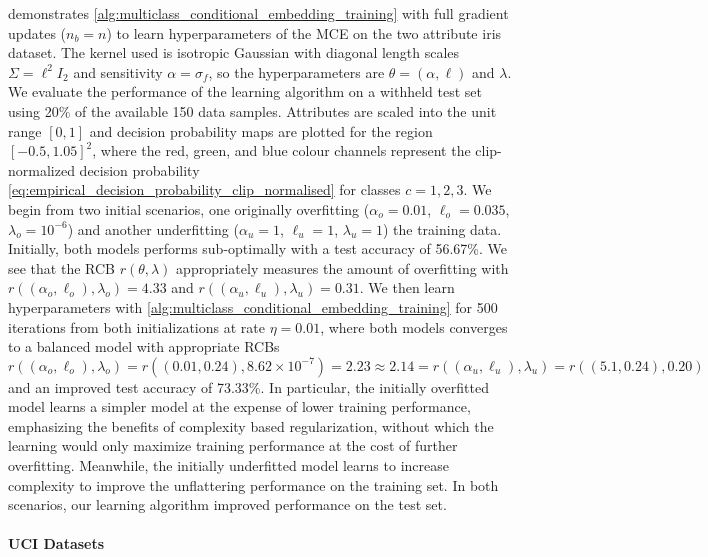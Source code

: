 \documentclass[twoside]{article}
\begin{document}
		 demonstrates \cref{alg:multiclass_conditional_embedding_training} with full gradient updates ($n_{b} = n$) to learn hyperparameters of the \gls{MCE} on the two attribute iris dataset. The kernel used is isotropic Gaussian with diagonal length scales $\Sigma = \ell^{2} I_{2}$ and sensitivity $\alpha = \sigma_{f}$, so the hyperparameters are $\theta = (\alpha, \ell)$ and $\lambda$. We evaluate the performance of the learning algorithm on a withheld test set using 20\% of the available 150 data samples. Attributes are scaled into the unit range $[0, 1]$ and decision probability maps are plotted for the region $[-0.5, 1.05]^{2}$, where the red, green, and blue colour channels represent the clip-normalized decision probability \eqref{eq:empirical_decision_probability_clip_normalised} for classes $c = 1, 2, 3$. We begin from two initial scenarios, one originally overfitting ($\alpha_{o} = 0.01$, $\ell_{o} = 0.035$, $\lambda_{o} = 10^{-6}$) and another underfitting ($\alpha_{u} = 1$, $\ell_{u} = 1$, $\lambda_{u} = 1$) the training data. Initially, both models performs sub-optimally with a test accuracy of 56.67\%. We see that the \gls{RCB} $r(\theta, \lambda)$ appropriately measures the amount of overfitting with $r((\alpha_{o}, \ell_{o}), \lambda_{o}) = 4.33$ and $r((\alpha_{u}, \ell_{u}), \lambda_{u}) = 0.31$. We then learn hyperparameters with \cref{alg:multiclass_conditional_embedding_training} for 500 iterations from both initializations at rate $\eta = 0.01$, where both models converges to a balanced model with appropriate \glspl{RCB} $r((\alpha_{o}, \ell_{o}), \lambda_{o}) = r((0.01, 0.24), 8.62 \times 10^{-7}) = 2.23 \approx 2.14 = r((\alpha_{u}, \ell_{u}), \lambda_{u}) = r((5.1, 0.24), 0.20)$ and an improved test accuracy of 73.33\%. In particular, the initially overfitted model learns a simpler model at the expense of lower training performance, emphasizing the benefits of complexity based regularization, without which the learning would only maximize training performance at the cost of further overfitting. Meanwhile, the initially underfitted model learns to increase complexity to improve the unflattering performance on the training set. In both scenarios, our learning algorithm improved performance on the test set.
	
	\paragraph{UCI Datasets}
	
\end{document}
